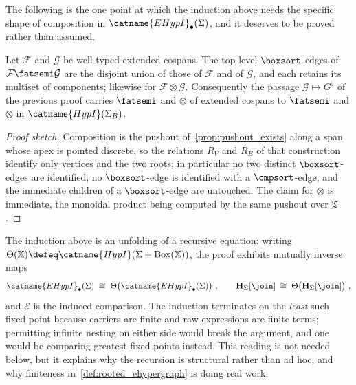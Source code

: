 The following is the one point at which the induction above needs the specific shape of
composition in $\catname{EHypI}_{\bullet}(\Sigma)$, and it deserves to be proved rather
than assumed.

\begin{lemma}\label{lemma:boxes_preserved}
Let $\mathcal{F}$ and $\mathcal{G}$ be well-typed extended cospans.
The top-level $\boxsort$-edges of $\mathcal{F} \fatsemi \mathcal{G}$ are the disjoint union
of those of $\mathcal{F}$ and of $\mathcal{G}$, and each retains its multiset of
components; likewise for $\mathcal{F} \otimes \mathcal{G}$.
Consequently the passage $\mathcal{G} \mapsto G^{\flat}$ of the previous proof carries
$\fatsemi$ and $\otimes$ of extended cospans to $\fatsemi$ and $\otimes$ in
$\catname{HypI}(\Sigma_{B})$.
\end{lemma}
\begin{proof}[Proof sketch]
Composition is the pushout of~\cref{prop:pushout_exists} along a span whose apex is
pointed discrete, so the relations $R_{V}$ and $R_{E}$ of that construction identify only
vertices and the two roots; in particular no two distinct $\boxsort$-edges are identified,
no $\boxsort$-edge is identified with a $\cmpsort$-edge, and the immediate children of a
$\boxsort$-edge are untouched.
The claim for $\otimes$ is immediate, the monoidal product being computed by the same
pushout over $\mathfrak{T}$.
\end{proof}

\begin{remark}\label{remark:fixed_point}
The induction above is an unfolding of a recursive equation: writing
$\Theta(\mathbb{X}) \defeq \catname{HypI}(\Sigma + \mathrm{Box}(\mathbb{X}))$, the proof
exhibits mutually inverse maps
\[
\catname{EHypI}_{\bullet}(\Sigma)
\;\cong\;
\Theta\bigl(\catname{EHypI}_{\bullet}(\Sigma)\bigr)~,
\qquad
\mathbf{H}_{\Sigma}[\join] \;\cong\; \Theta\bigl(\mathbf{H}_{\Sigma}[\join]\bigr)~,
\]
and $\mathcal{E}$ is the induced comparison.
The induction terminates on the \emph{least} such fixed point because carriers are finite
and raw expressions are finite terms; permitting infinite nesting on either side would
break the argument, and one would be comparing greatest fixed points instead.
This reading is not needed below, but it explains why the recursion is structural rather
than ad hoc, and why finiteness in~\cref{def:rooted_ehypergraph} is doing real work.
\end{remark}

